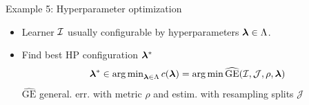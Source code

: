 \documentclass[11pt,compress,t,notes=noshow, xcolor=table]{beamer}
\begin{document}
\begin{vbframe}{Example 5: Hyperparameter optimization}

\begin{itemize}
	\item Learner $\mathcal{I}$ usually configurable by hyperparameters $\bm{\lambda} \in \Lambda$. 
	\item Find best HP configuration $\bm{\lambda}^\ast$ 
	$$
	\bm{\lambda}^\ast \in \operatorname{arg\,min}\nolimits_{\bm{\lambda} \in \Lambda} c(\bm{\lambda}) = \operatorname{arg\,min} \widehat{\text{GE}}(\mathcal{I}, \mathcal{J}, \rho, \bm{\lambda})
	$$
	$\widehat{\text{GE}}$ general. err. with metric $\rho$ and estim. with resampling splits $\mathcal{J}$ 
\end{itemize}

\vspace*{-0.2cm}

\begin{columns}
\begin{column}{0.6\textwidth}


\end{column}
\end{columns}
\end{vbframe}
\end{document}
